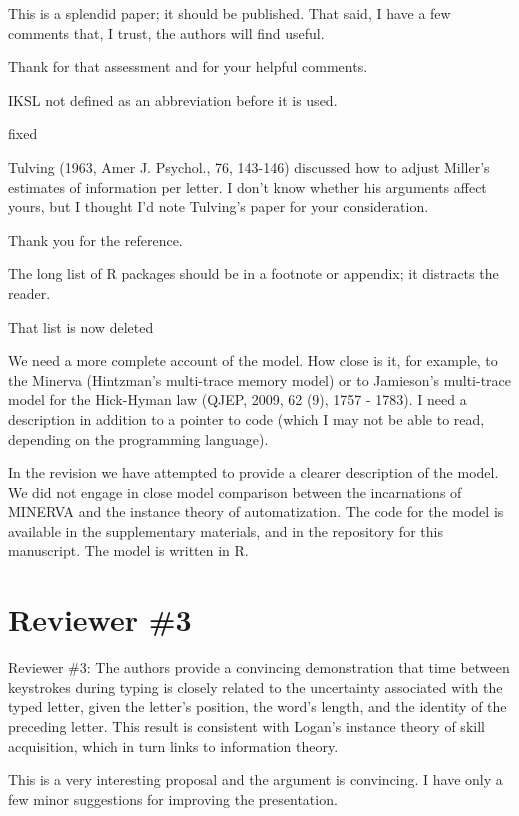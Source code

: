 \documentclass[draft]{article}
\begin{document}
\RC This is a splendid paper; it should be published. That said, I have a few comments that, I trust, the authors will find useful.

Thank for that assessment and for your helpful comments.

\RC IKSL not defined as an abbreviation before it is used.

fixed

\RC Tulving (1963, Amer J. Psychol., 76, 143-146) discussed how to adjust Miller's estimates of information per letter. I don't know whether his arguments affect yours, but I thought I'd note Tulving's paper for your consideration.

Thank you for the reference.

\RC The long list of R packages should be in a footnote or appendix; it distracts the reader.

That list is now deleted

\RC We need a more complete account of the model. How close is it, for example, to the Minerva (Hintzman's multi-trace memory model) or to Jamieson's multi-trace model for the Hick-Hyman law (QJEP, 2009, 62 (9), 1757 - 1783). I need a description in addition to a pointer to code (which I may not be able to read, depending on the programming language).

In the revision we have attempted to provide a clearer description of the model. We did not engage in close model comparison between the incarnations of MINERVA and the instance theory of automatization. The code for the model is available in the supplementary materials, and in the repository for this manuscript. The model is written in R.

\hypertarget{reviewer-3}{%
\section{Reviewer \#3}\label{reviewer-3}}

Reviewer \#3: The authors provide a convincing demonstration that time between keystrokes during typing is closely related to the uncertainty associated with the typed letter, given the letter's position, the word's length, and the identity of the preceding letter. This result is consistent with Logan's instance theory of skill acquisition, which in turn links to information theory.

\RC This is a very interesting proposal and the argument is convincing. I have only a few minor suggestions for improving the presentation.
\end{document}
